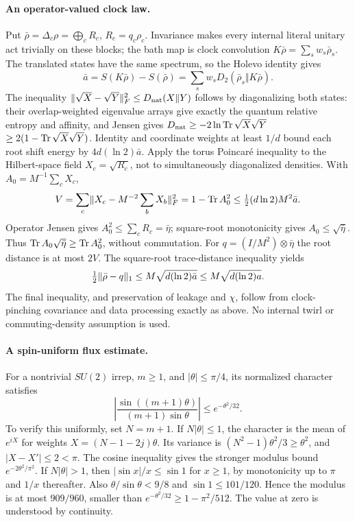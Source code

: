 \paragraph{An operator-valued clock law.}
Put $\bar\rho=\Delta_c\rho=\bigoplus_cR_c$,
$R_c=q_c\rho_c$. Invariance makes every internal literal unitary
act trivially on these blocks; the bath map is clock convolution
$K\bar\rho=\sum_sw_s\bar\rho_s$.
The translated states have the same spectrum, so the Holevo identity gives
\[
 \bar a=S(K\bar\rho)-S(\bar\rho)
          =\sum_sw_sD_2(\bar\rho_s\Vert K\bar\rho).
\]
The inequality $\lVert \sqrt X-\sqrt Y\rVert_F^2\leq D_{\rm nat}(X\Vert Y)$
follows by diagonalizing both states: their overlap-weighted eigenvalue
arrays give exactly the quantum relative entropy and affinity,
and Jensen gives $D_{\rm nat}\geq-2\ln\operatorname{Tr}\sqrt X\sqrt Y$
$\geq2(1-\operatorname{Tr}\sqrt X\sqrt Y)$.
Identity and coordinate weights at least $1/d$ bound each root
shift energy by $4d(\ln2)\bar a$.
Apply the torus Poincar\'e inequality to the Hilbert-space field
$X_c=\sqrt{R_c}$, not to simultaneously diagonalized densities.
With $A_0=M^{-1}\sum_cX_c$,
\[
 V=\sum_c\lVert X_c-M^{-2}\sum_bX_b\rVert_F^2
   =1-\operatorname{Tr} A_0^2\leq\tfrac12(d\ln2)M^2\bar a.
\]
Operator Jensen gives $A_0^2\leq\sum_cR_c=\bar\eta$;
square-root monotonicity gives $A_0\leq\sqrt{\bar\eta}$.
Thus $\operatorname{Tr} A_0\sqrt{\bar\eta}\geq\operatorname{Tr} A_0^2$, without commutation.
For $q=(I/M^2)\otimes\bar\eta$ the root distance is at most $2V$.
The square-root trace-distance inequality yields
\begin{equation}\label{eq:operator-clock-law}
 \tfrac12\lVert \bar\rho-q\rVert_1\leq M\sqrt{d(\ln2)\bar a}
                         \leq M\sqrt{d(\ln2)a}.
\end{equation}
The final inequality, and preservation of leakage and $\chi$,
follow from clock-pinching covariance and data processing exactly
as above. No internal twirl or commuting-density assumption is used.

\paragraph{A spin-uniform flux estimate.}
For a nontrivial $SU(2)$ irrep, $m\geq1$, and $|\theta|\leq\pi/4$,
its normalized character satisfies
\begin{equation}\label{eq:uniform-spin-character}
 \left|\frac{\sin((m+1)\theta)}{(m+1)\sin\theta}\right|
          \leq e^{-\theta^2/32}.
\end{equation}
To verify this uniformly, set $N=m+1$. If $N|\theta|\leq1$,
the character is the mean of $e^{iX}$ for weights
$X=(N-1-2j)\theta$. Its variance is
$(N^2-1)\theta^2/3\geq\theta^2$, and $|X-X'|\leq2<\pi$.
The cosine inequality gives the stronger modulus bound
$e^{-2\theta^2/\pi^2}$. If $N|\theta|>1$, then
$|\sin x|/x\leq\sin1$ for $x\geq1$, by monotonicity up to $\pi$
and $1/x$ thereafter. Also $\theta/\sin\theta<9/8$ and
$\sin1\leq101/120$. Hence the modulus is at most $909/960$,
smaller than $e^{-\theta^2/32}\geq1-\pi^2/512$.
The value at zero is understood by continuity.

